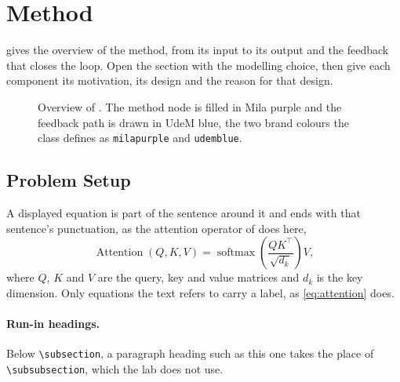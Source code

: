 \section{Method}
\label{sec:method}

 gives the overview of the method, from its input to its output and the feedback that closes the loop.
Open the section with the modelling choice, then give each component its motivation, its design and the reason for that design.

\begin{figure}[t]
  \centering
  
  \caption{Overview of \method{}. The method node is filled in Mila purple and the feedback path is drawn in UdeM blue, the two brand colours the class defines as \texttt{milapurple} and \texttt{udemblue}.}
  \label{fig:overview}
\end{figure}

\subsection{Problem Setup}
\label{sec:problem-setup}

A displayed equation is part of the sentence around it and ends with that sentence's punctuation, as the attention operator of \citet{vaswani2017attention} does here,
\begin{equation}
  \operatorname{Attention}(Q, K, V) = \operatorname{softmax}\!\left(\frac{QK^\top}{\sqrt{d_k}}\right) V,
  \label{eq:attention}
\end{equation}
where $Q$, $K$ and $V$ are the query, key and value matrices and $d_k$ is the key dimension.
Only equations the text refers to carry a label, as \cref{eq:attention} does.

\paragraph{Run-in headings.}
Below \verb|\subsection|, a paragraph heading such as this one takes the place of \verb|\subsubsection|, which the lab does not use.
